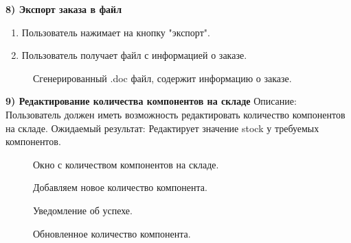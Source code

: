 \textbf{8) Экспорт заказа в файл}
\begin{enumerate}
	\item Пользователь нажимает на кнопку "экспорт".
	\item Пользователь получает файл с информацией о заказе.
\end{enumerate}

\begin{figure}[ht]
	\caption{Сгенерированный .doc файл, содержит информацию о заказе.}
	\label{stored:docdoc}
\end{figure}

\textbf{9) Редактирование количества компонентов на складе}
Описание: Пользователь должен иметь возможность редактировать количество компонентов на складе.
Ожидаемый результат: Редактирует значение stock у требуемых компонентов.

\begin{figure}[ht]
	\caption{Окно с количеством компонентов на складе.}
	\label{stored:warehouse0}
\end{figure}

\begin{figure}[ht]
	\caption{Добавляем новое количество компонента.}
	\label{stored:stock0}
\end{figure}

\begin{figure}[ht]
	\caption{Уведомление об успехе.}
	\label{stored:stock1}
\end{figure}

\begin{figure}[ht]
	\caption{Обновленное количество компонента.}
	\label{stored:stock2}
\end{figure}

\clearpage
